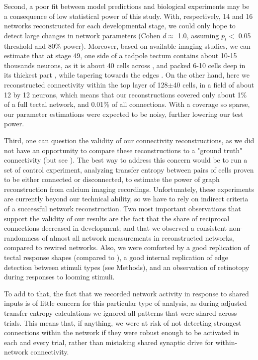 \documentclass{article}
\begin{document}
Second, a poor fit between model predictions and biological experiments may be a consequence of low statistical power of this study. With, respectively, 14 and 16 networks reconstructed for each developmental stage, we could only hope to detect large changes in network parameters (Cohen $d \approx$ 1.0, assuming $p_t<$ 0.05 threshold and 80\% power). Moreover, based on available imaging studies, we can estimate that at stage 49, one side of a tadpole tectum contains about 10-15 thousands neurons, as it is about 40 cells across \citep{hiramoto2009}, and packed 6-10 cells deep in its thickest part \citep{hewapathirane2008vivo}, while tapering towards the edges \citep{bollmann2009}. On the other hand, here we reconstructed connectivity within the top layer of 128$\pm$40 cells, in a field of about 12 by 12 neurons, which means that our reconstructions covered only about 1\% of a full tectal network, and 0.01\% of all connections. With a coverage so sparse, our parameter estimations were expected to be noisy, further lowering our test power.

Third, one can question the validity of our connectivity reconstructions, as we did not have an opportunity to compare these reconstructions to a "ground truth" connectivity (but see \citealt{xu2011}). The best way to address this concern would be to run a set of control experiment, analyzing transfer entropy between pairs of cells proven to be either connected or disconnected, to estimate the power of graph reconstruction from calcium imaging recordings. Unfortunately, these experiments are currently beyond our technical ability, so we have to rely on indirect criteria of a successful network reconstruction. Two most important observations that support the validity of our results are the fact that the share of reciprocal connections decreased in development; and that we observed a consistent non-randomness of almost all network measurements in reconstructed networks, compared to rewired networks. Also, we were comforted by a good replication of tectal response shapes (compared to \citealt{khakhalin2014}), a good internal replication of edge detection between stimuli types (see Methods), and an observation of retinotopy during responses to looming stimuli.

To add to that, the fact that we recorded network activity in response to shared inputs is of little concern for this particular type of analysis, as during adjusted transfer entropy calculations we ignored all patterns that were shared across trials. This means that, if anything, we were at risk of not detecting strongest connections within the network if they were robust enough to be activated in each and every trial, rather than mistaking shared synaptic drive for within-network connectivity.
\end{document}

